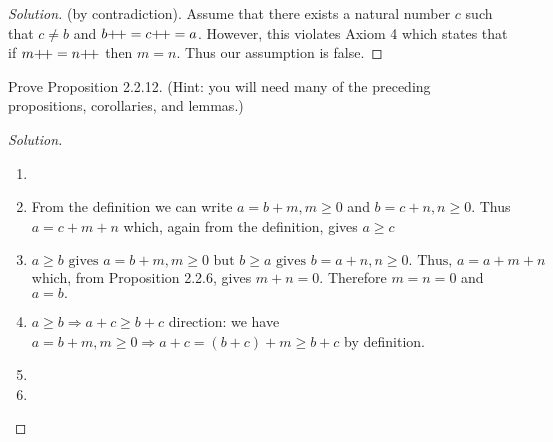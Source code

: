 \documentclass[12pt]{article}
\theoremstyle{remark}
\newcommand{\exercise}[1]{\noindent {\bf Exercise #1.}}
\def\inc{{\mathrel+\joinrel\mathrel+}}
\begin{document}
\begin{proof}[Solution] (by contradiction).
    Assume that there exists a natural number $ c $ such that $ c \neq b $ and $ b\inc = c\inc = a $. However, this violates Axiom 4 which states that if $ m\inc = n\inc $ then $ m=n $. Thus our assumption is false. 
\end{proof}
    
\exercise{2.2.3} Prove Proposition 2.2.12. (Hint: you will need many of the
preceding propositions, corollaries, and lemmas.)

\begin{proof}[Solution] \hfill
	\begin{enumerate}[label=(\alph*)]
		\item
		\item From the definition we can write $ a = b+m, m \geq 0 $ and $ b = c+n, n \geq 0 $. Thus $ a = c+m+n $ which, again from the definition, gives $ a \geq c $
		\item $ a \geq b \text{ gives } a = b + m, m \geq 0 \text{ but } b \geq a \text{ gives } b = a + n, n \geq 0. \text{ Thus, } a = a + m + n $ which, from Proposition 2.2.6, gives $ m + n = 0 $. Therefore $ m = n = 0 $ and $ a = b .$ 
		\item $ a \geq b \Rightarrow a+c \geq b+c $ direction: we have $ a = b+m, m \geq 0  \Rightarrow a+c = (b+c)+m \geq b+c $ by definition.
		\item
		\item 
	\end{enumerate}
\end{proof}
\end{document}
